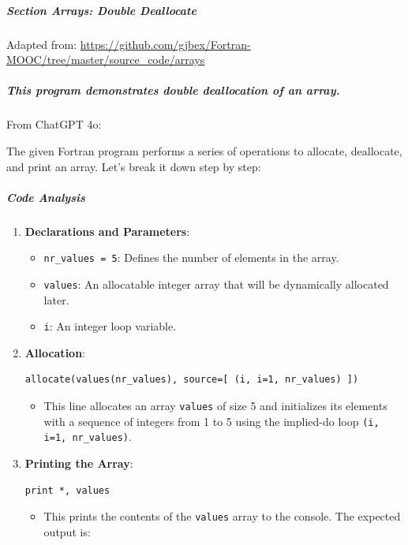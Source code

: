 \subparagraph{Section Arrays: Double Deallocate}

Adapted from: \href{https://github.com/gjbex/Fortran-MOOC/tree/master/source\_code/arrays}{https://github.com/gjbex/Fortran-MOOC/tree/master/source\_code/arrays}

\subparagraph{This program demonstrates double deallocation of an array.}

From ChatGPT 4o:

The given Fortran program performs a series of operations to allocate, deallocate, and print an array. Let's break it down step by step:

\subparagraph{Code Analysis}

\begin{enumerate}
\item \textbf{Declarations and Parameters}:

\begin{itemize}
\item \texttt{nr\_values = 5}: Defines the number of elements in the array.
\item \texttt{values}: An allocatable integer array that will be dynamically allocated later.
\item \texttt{i}: An integer loop variable.
\end{itemize}


\item \textbf{Allocation}:

\begin{verbatim}
allocate(values(nr_values), source=[ (i, i=1, nr_values) ])
\end{verbatim}

\begin{itemize}
\item This line allocates an array \texttt{values} of size 5 and initializes its elements with a sequence of integers from 1 to 5 using the implied-do loop \texttt{(i, i=1, nr\_values)}.
\end{itemize}


\item \textbf{Printing the Array}:

\begin{verbatim}
print *, values
\end{verbatim}

\begin{itemize}
\item This prints the contents of the \texttt{values} array to the console. The expected output is:


\end{itemize}
\end{enumerate}
